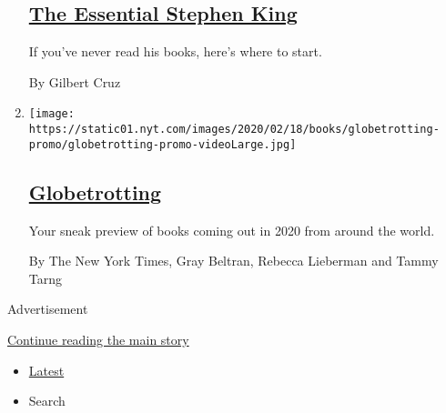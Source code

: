 \begin{enumerate}
  \hypertarget{the-essential-stephen-king}{%
  \subsection{\texorpdfstring{\href{/interactive/2020/05/04/arts/best-stephen-king-books.html}{The
  Essential Stephen
  King}}{The Essential Stephen King}}\label{the-essential-stephen-king}}

  If you've never read his books, here's where to start.

  By Gilbert Cruz
\item
  \texttt{[image: https://static01.nyt.com/images/2020/02/18/books/globetrotting-promo/globetrotting-promo-videoLarge.jpg]}

  \hypertarget{globetrotting}{%
  \subsection{\texorpdfstring{\href{/interactive/2020/01/08/books/new-books-international.html}{Globetrotting}}{Globetrotting}}\label{globetrotting}}

  Your sneak preview of books coming out in 2020 from around the world.

  By The New York Times, Gray Beltran, Rebecca Lieberman and Tammy Tarng
\end{enumerate}

Advertisement

\protect\hyperlink{after-mid3}{Continue reading the main story}

\begin{itemize}
\tightlist
\item
  \protect\hyperlink{stream-panel}{Latest}
\item
  Search
\end{itemize}

